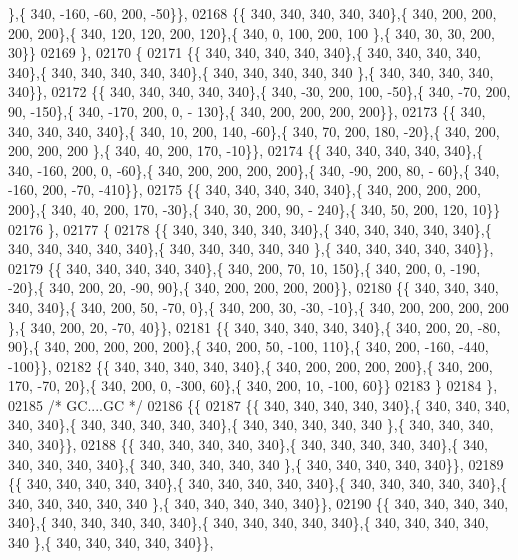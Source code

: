 \begin{DoxyCode}
      \},\{ 340, -160, -60, 200, -50\}\},
02168 \{\{ 340, 340, 340, 340, 340\},\{ 340, 200, 200, 200, 200\},\{ 340, 120, 120, 200, 120\},\{ 340,   0, 100, 200, 100
      \},\{ 340,  30,  30, 200,  30\}\}
02169 \},
02170 \{
02171 \{\{ 340, 340, 340, 340, 340\},\{ 340, 340, 340, 340, 340\},\{ 340, 340, 340, 340, 340\},\{ 340, 340, 340, 340, 340
      \},\{ 340, 340, 340, 340, 340\}\},
02172 \{\{ 340, 340, 340, 340, 340\},\{ 340, -30, 200, 100, -50\},\{ 340, -70, 200,  90, -150\},\{ 340, -170, 200,   0, -
      130\},\{ 340, 200, 200, 200, 200\}\},
02173 \{\{ 340, 340, 340, 340, 340\},\{ 340,  10, 200, 140, -60\},\{ 340,  70, 200, 180, -20\},\{ 340, 200, 200, 200, 200
      \},\{ 340,  40, 200, 170, -10\}\},
02174 \{\{ 340, 340, 340, 340, 340\},\{ 340, -160, 200,   0, -60\},\{ 340, 200, 200, 200, 200\},\{ 340, -90, 200,  80, -
      60\},\{ 340, -160, 200, -70, -410\}\},
02175 \{\{ 340, 340, 340, 340, 340\},\{ 340, 200, 200, 200, 200\},\{ 340,  40, 200, 170, -30\},\{ 340,  30, 200,  90, -
      240\},\{ 340,  50, 200, 120,  10\}\}
02176 \},
02177 \{
02178 \{\{ 340, 340, 340, 340, 340\},\{ 340, 340, 340, 340, 340\},\{ 340, 340, 340, 340, 340\},\{ 340, 340, 340, 340, 340
      \},\{ 340, 340, 340, 340, 340\}\},
02179 \{\{ 340, 340, 340, 340, 340\},\{ 340, 200,  70,  10, 150\},\{ 340, 200,   0, -190, -20\},\{ 340, 200,  20, -90,  
      90\},\{ 340, 200, 200, 200, 200\}\},
02180 \{\{ 340, 340, 340, 340, 340\},\{ 340, 200,  50, -70,   0\},\{ 340, 200,  30, -30, -10\},\{ 340, 200, 200, 200, 200
      \},\{ 340, 200,  20, -70,  40\}\},
02181 \{\{ 340, 340, 340, 340, 340\},\{ 340, 200,  20, -80,  90\},\{ 340, 200, 200, 200, 200\},\{ 340, 200,  50, -100, 
      110\},\{ 340, 200, -160, -440, -100\}\},
02182 \{\{ 340, 340, 340, 340, 340\},\{ 340, 200, 200, 200, 200\},\{ 340, 200, 170, -70,  20\},\{ 340, 200,   0, -300,  
      60\},\{ 340, 200,  10, -100,  60\}\}
02183 \}
02184 \},
02185 \textcolor{comment}{/* GC....GC */}
02186 \{\{
02187 \{\{ 340, 340, 340, 340, 340\},\{ 340, 340, 340, 340, 340\},\{ 340, 340, 340, 340, 340\},\{ 340, 340, 340, 340, 340
      \},\{ 340, 340, 340, 340, 340\}\},
02188 \{\{ 340, 340, 340, 340, 340\},\{ 340, 340, 340, 340, 340\},\{ 340, 340, 340, 340, 340\},\{ 340, 340, 340, 340, 340
      \},\{ 340, 340, 340, 340, 340\}\},
02189 \{\{ 340, 340, 340, 340, 340\},\{ 340, 340, 340, 340, 340\},\{ 340, 340, 340, 340, 340\},\{ 340, 340, 340, 340, 340
      \},\{ 340, 340, 340, 340, 340\}\},
02190 \{\{ 340, 340, 340, 340, 340\},\{ 340, 340, 340, 340, 340\},\{ 340, 340, 340, 340, 340\},\{ 340, 340, 340, 340, 340
      \},\{ 340, 340, 340, 340, 340\}\},

\end{DoxyCode}
